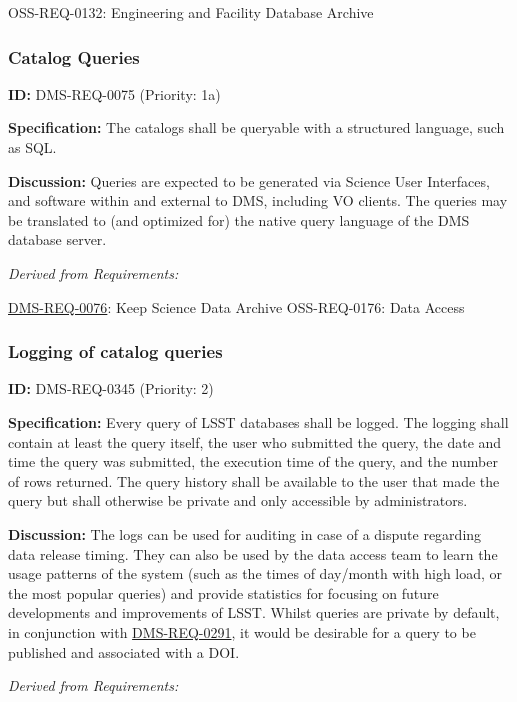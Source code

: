 \documentclass[SE,toc,lsstdraft]{lsstdoc}
\begin{document}
OSS-REQ-0132:
Engineering and Facility Database Archive \newline

\subsubsection{Catalog Queries}

\label{DMS-REQ-0075}
\textbf{ID:} DMS-REQ-0075 (Priority: 1a)

\textbf{Specification:} The catalogs shall be queryable with a structured language, such as SQL.

\textbf{Discussion:} Queries are expected to be generated via Science User Interfaces, and software within and external to DMS, including VO clients. The queries may be translated to (and optimized for) the native query language of the DMS database server.

\emph{Derived from Requirements:}

\hyperref[DMS-REQ-0076]{DMS-REQ-0076}:
Keep Science Data Archive \newline
OSS-REQ-0176:
Data Access \newline

\subsubsection{Logging of catalog queries}

\label{DMS-REQ-0345}
\textbf{ID:} DMS-REQ-0345 (Priority: 2)

    \textbf{Specification: }Every query of LSST databases shall be logged. The logging shall contain at least the query itself, the user who submitted the query, the date and time the query was submitted, the execution time of the query, and the number of rows returned. The query history shall be available to the user that made the query but shall otherwise be private and only accessible by administrators.

    \textbf{Discussion: }The logs can be used for auditing in case of a dispute regarding data release timing. They can also be used by the data access team to learn the usage patterns of the system (such as the times of day/month with high load, or the most popular queries) and provide statistics for focusing on future developments and improvements of LSST. Whilst queries are private by default, in conjunction with \hyperref[DMS-REQ-0291]{DMS-REQ-0291}, it would be desirable for a query to be published and associated with a DOI.

\emph{Derived from Requirements:}
\end{document}
